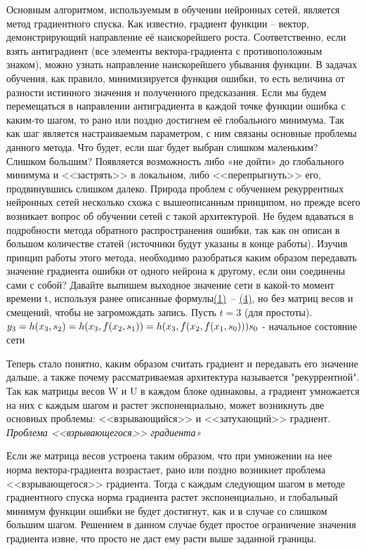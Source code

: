 \documentclass[12pt, a4paper]{article}
\begin{document}
Основным алгоритмом, используемым в обучении нейронных сетей, является метод градиентного спуска. Как известно, градиент функции – вектор, демонстрирующий направление её наискорейшего роста. Соответственно, если взять антиградиент (все элементы вектора-градиента с противоположным знаком), можно узнать направление наискорейшего убывания функции. В задачах обучения, как правило, минимизируется функция ошибки, то есть величина от разности истинного значения и полученного предсказания. Если мы будем перемещаться в направлении антиградиента в каждой точке функции ошибка с каким-то шагом, то рано или поздно достигнем её глобального минимума. Так как шаг является настраиваемым параметром, с ним связаны основные проблемы данного метода. Что будет, если шаг будет выбран слишком маленьким? Слишком большим? Появляется возможность либо «не дойти» до глобального минимума и <<застрять>> в локальном, либо <<перепрыгнуть>> его, продвинувшись слишком далеко.
Природа проблем с обучением рекуррентных нейронных сетей несколько схожа с вышеописанным принципом, но прежде всего возникает вопрос об обучении сетей с такой архитектурой. Не будем вдаваться в подробности метода обратного распространения ошибки, так как он описан в большом количестве статей (источники будут указаны в конце работы). Изучив принцип работы этого метода, необходимо разобраться каким образом передавать значение градиента ошибки от одного нейрона к другому, если они соединены сами с собой? Давайте выпишем выходное значение сети в какой-то момент времени t, используя ранее описанные формулы\hyperref[formula]{(1)}~-- \hyperref[formula3]{(4)}, но без матриц весов и смещений, чтобы не загромождать запись. Пусть $t = 3$ (для простоты).\\
$y_3 = h(x_3, s_2) =
h(x_3, f(x_2, s_1)) =
h(x_3, f(x_2, f(x_1, s_0)))\\
\noindent
s_0$ - начальное состояние сети

Теперь стало понятно, каким образом считать градиент и передавать его значение дальше, а также почему рассматриваемая архитектура называется "рекуррентной".
Так как матрицы весов W и U в каждом блоке одинаковы, а градиент умножается на них с каждым шагом и растет экспоненциально, может возникнуть две основных проблемы: <<взрывающийся>> и <<затухающий>> градиент.\\

\textit{Проблема <<взрывающегося>> градиента»}

Если же матрица весов устроена таким образом, что при умножении на нее норма вектора-градиента возрастает, рано или поздно возникнет проблема <<взрывающегося>> градиента. Тогда с каждым следующим шагом в методе градиентного спуска норма градиента растет экспоненциально, и глобальный минимум функции ошибки не будет достигнут, как и в случае со слишком большим шагом. Решением в данном случае будет простое ограничение значения градиента извне, что просто не даст ему расти выше заданной границы. \\
\end{document}
